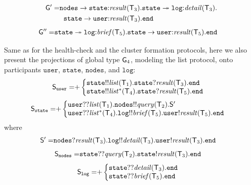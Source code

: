 \begin{align*}
\begin{split}
	{\sf G}' =  & 
	\mathtt{nodes}\to\mathtt{state}{:}\mathit{result}({\mathsf T}_3).\mathtt{state}\twoheadrightarrow \mathtt{log}{:}\mathit{detail}({\mathsf T}_3). \\
	& \hspace{2mm}
	\mathtt{state}\to\mathtt{user}{:}\mathit{result}({\mathsf T}_3).\mathtt{end}
\end{split}
\end{align*}
\begin{align*}
	{\sf G}'' = &
	\mathtt{state}\twoheadrightarrow \mathtt{log}{:}\mathit{brief}({\mathsf T}_5).\mathtt{state}\to\mathtt{user}{:}\mathit{result}({\mathsf T}_5).\mathtt{end}
\end{align*}

\noindent
Same as for the health-check and the cluster formation protocols, here we also present the projections of global type ${\sf G}_4$, modeling the list protocol, onto participants $\mathtt{user}$, $\mathtt{state}$, $\mathtt{nodes}$, and $\mathtt{log}$:
\begin{align*}
	\ST_\mathtt{user} =& 
	{+}
	\left\{
	\begin{array}{@{}l@{}}  
	\mathtt{state}{!!}\mathit{list}(\T_1).\mathtt{state}{?}\mathit{result}(\T_3).\tend \\
	\mathtt{state}{!!}\mathit{list^*}(\T_4).\mathtt{state}{?}\mathit{result}(\T_5).\tend 
	\end{array} \right.
\end{align*}
\begin{align*}
	\ST_\mathtt{state} =&
	{+}
	\left\{
	\begin{array}{@{}l@{}}  
	\mathtt{user}{??}\mathit{list}(\T_1).\mathtt{nodes}{!!}\mathit{query}(\T_2).\ST'\\
	\mathtt{user}{??}\mathit{list^*}(\T_4).\mathtt{log}{!!}\mathit{brief}(\T_5).\mathtt{user}{!}\mathit{result}(\T_5).\tend
	\end{array} \right. 
\end{align*}
where
\begin{align*}
	{\mathsf S}'  =& 
	\mathtt{nodes}{?}\mathit{result}({\mathsf T}_3).\mathtt{log}{!!}\mathit{detail}({\mathsf T}_3).\mathtt{user}{!}\mathit{result}({\mathsf T}_3).\mathtt{end}
\end{align*}
\begin{align*}
	{\mathsf S}_\mathtt{nodes} = &
	\mathtt{state}{??}\mathit{query}({\mathsf T}_2).\mathtt{state}{!}\mathit{result}({\mathsf T}_3).\mathtt{end}
\end{align*}
\begin{align*}
	\ST_\mathtt{log} = & 
	{+}
	\left\{
	\begin{array}{@{}l@{}}  
	\mathtt{state}{??}\mathit{detail}(\T_3).\tend \\
	\mathtt{state}{??}\mathit{brief}(\T_5).\tend \\
	\end{array} \right.
\end{align*}


